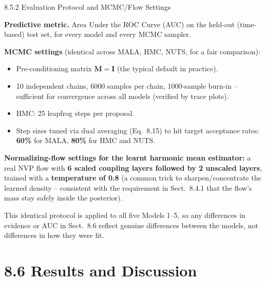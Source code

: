 \documentclass[aspectratio=169,10pt]{beamer}
\begin{document}
\begin{frame}[allowframebreaks]{8.5.2 Evaluation Protocol and MCMC/Flow Settings}

\textbf{Predictive metric.} Area Under the ROC Curve (AUC) on the held-out (time-based) test set, for every model and every MCMC sampler.

\textbf{MCMC settings} (identical across MALA, HMC, NUTS, for a fair comparison):
\begin{itemize}
  \item Pre-conditioning matrix $\mathbf{M} = \mathbf{I}$ (the typical default in practice).
  \item 10 independent chains, 6000 samples per chain, 1000-sample burn-in -- sufficient for convergence across all models (verified by trace plots).
  \item HMC: 25 leapfrog steps per proposal.
  \item Step sizes tuned via dual averaging (Eq.\ 8.15) to hit target acceptance rates: \textbf{60\%} for MALA, \textbf{80\%} for HMC and NUTS.
\end{itemize}

\framebreak

\textbf{Normalizing-flow settings for the learnt harmonic mean estimator:} a real NVP flow with \textbf{6 scaled coupling layers followed by 2 unscaled layers}, trained with a \textbf{temperature of 0.8} (a common trick to sharpen/concentrate the learned density -- consistent with the requirement in Sect.\ 8.4.1 that the flow's mass stay safely inside the posterior).

This identical protocol is applied to all five Models 1--5, so any differences in evidence or AUC in Sect.\ 8.6 reflect genuine differences between the models, not differences in how they were fit.

\end{frame}

\section{8.6 Results and Discussion}
\end{document}
